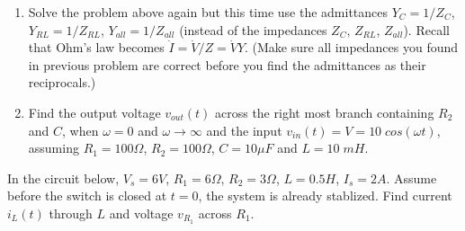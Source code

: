 \begin{enumerate}

\item Solve the problem above again but this time use the admittances 
$Y_C=1/Z_C$, $Y_{RL}=1/Z_{RL}$, $Y_{all}=1/Z_{all}$ (instead of the
impedances $Z_C$, $Z_{RL}$, $Z_{all}$). Recall that Ohm's law becomes
$\dot{I}=\dot{V}/Z=\dot{V}Y$. (Make sure all impedances you found in 
previous problem are correct before you find the admittances as their 
reciprocals.)




\item Find the output voltage $v_{out}(t)$ across the right most branch
containing $R_2$ and $C$, when $\omega=0$ and $\omega\rightarrow \infty$ 
and the input $v_{in}(t)=V=10\;cos(\omega t)$, assuming $R_1=100\Omega$, 
$R_2=100\Omega$, $C=10\mu F$ and $L=10\;mH$.


% 

\end{enumerate}



\item In the circuit below, $V_s=6V$, $R_1=6\Omega$, $R_2=3\Omega$,
$L=0.5H$, $I_s=2A$. Assume before the switch is closed at $t=0$, the
system is already stablized. Find current $i_L(t)$ through $L$ and 
voltage $v_{R_1}$ across $R_1$.

